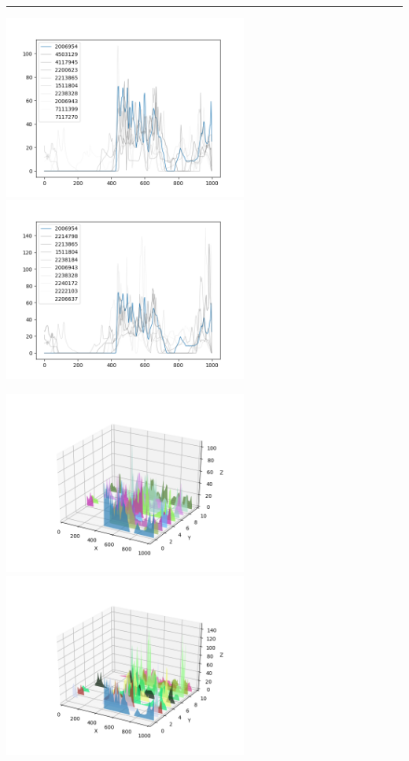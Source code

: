\documentclass{article}
\begin{document}
\begin{center}
\noindent\rule{\textwidth}{1pt}

\includegraphics[height=6cm, width=8cm]{4.png}\includegraphics[height=6cm, width=8cm]{4_cos.png}

\includegraphics[height=6cm, width=8cm]{4_3d.png} \includegraphics[height=6cm, width=8cm]{4_cos_3d.png}


\end{center}
\end{document}
